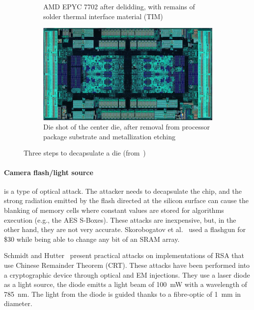 \begin{figure}[ht]
\begin{subfigure}[b]{0.3\textwidth}
        \caption{AMD EPYC 7702 after delidding, with remains of solder thermal interface material (TIM)}
        \label{fig:delidding_die}
    \end{subfigure}
    \hfill
    \begin{subfigure}[b]{0.3\textwidth}
        \includegraphics[width=\textwidth]{c2_soa/img/epyc_7702_packagedRemoved.jpg}
        \caption{Die shot of the center die, after removal from processor package substrate and metallization etching}
        \label{fig:packagedRemoved_die}
    \end{subfigure}
    \caption{Three steps to decapsulate a die (from~\cite{decapping-19-wikipedia})}
    \label{fig:decapsulating_die}
\end{figure}


\paragraph{Camera flash/light source} is a type of optical attack. The attacker needs to decapsulate the chip, and the strong radiation emitted by the flash directed at the silicon surface can cause the blanking of memory cells where constant values are stored for algorithms execution (e.g., the AES S-Boxes). These attacks are inexpensive, but, in the other hand, they are not very accurate. Skorobogatov et al.~\cite{SA-02-ches} used a flashgun for \$30 while being able to change any bit of an SRAM array.

Schmidt and Hutter~\cite{SH-07-austrochip} present practical attacks on implementations of RSA that use Chinese Remainder Theorem (CRT). These attacks have been performed into a cryptographic device through optical and EM injections. They use a laser diode  as a light source, the diode emitts a light  beam of \SI{100}{\milli\watt} with a wavelength of \SI{785}{\nano\metre}. The light from the diode is guided thanks to a fibre-optic of 1~mm in diameter.

